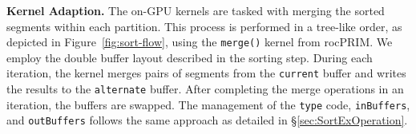 \begin{comment}
The input to this operation is $N$ sorted chunks each with a size of $C$.
The mapping step regroups those chunks in to $N$ new chunks $P_i\ (0 \leq i < N)$ such that max($P_i$) $\leq$ min($P_{i + 1}$) $\forall 0 \leq i < N - 1$.
Each new chunk contains $N$ sorted segments which can be efficiently merged on GPU.
For the convenience of explaining the idea, let us first assume all elements in the input are unique with a type $T$.
By performing binary searches on each sorted chunk, we can efficiently know the inclusive/exclusive percentile of a certain value $t \in T$ within the input.
This enables us to find, in a radix order, $N + 1$ different pivots $p_i \in T\ (i = 0, \ldots, N)$, where $p_i$ is the $\frac{i}{N}$th percentile of the entire input data. 
There are exactly $C$ elements $v$ in the input that satisfies $p_i \leq v < p_{i + 1}\ (0 \leq i < N)$, which can be efficiently located in the $N$ input sorted chunks.
Then, we can regroup a new chunk by taking all elements between two pivots from each sorted chunk.
This idea is illustrated in Figure~\ref{fig:sort-flow}, where the white points on the \texttt{MergeExKernel}'s \texttt{inputs()} represent the location of pivots.
These white dots separate the input chunks and then regroup them into 4 partitions.
This idea can be easily extended to support the case where the values are not unique. 
Slight adjustment to the partition boundary can be applied to ensure each chunk contains exactly $C$ elements.
The output is partitioned accordingly to hold the final result.
\end{comment}

\noindent
\textbf{Kernel Adaption.}
The on-GPU kernels are tasked with merging the sorted segments within each partition. 
This process is performed in a tree-like order, as depicted in Figure~\ref{fig:sort-flow}, using the \texttt{merge()} kernel from rocPRIM.
We employ the double buffer layout described in the sorting step. 
During each iteration, the kernel merges pairs of segments from the \texttt{current} buffer and writes the results to the \texttt{alternate} buffer. 
After completing the merge operations in an iteration, the buffers are swapped. 
The management of the \texttt{type} code, \texttt{inBuffers}, and \texttt{outBuffers} follows the same approach as detailed in \S\ref{sec:SortExOperation}.

\begin{comment}
The responsibility of the on-GPU kernels is to merge the sorted segments in each partition together.
We iteratively merge the segments in a tree-like order as shown in Figure~\ref{fig:sort-flow}, using the \texttt{merge()} kernel from rocPRIM.
We follow the double buffer data layout mentioned in the sort step.
In each iteration, we merge the pairs of segments with \texttt{merge()} from \texttt{current} and output the result to \texttt{alternate}.
At the end of each iteration, we swap the double buffer. 
The \texttt{type} code, \texttt{inBuffers}, and \texttt{outBuffers} are managed in a similar way as \S\ref{sec:SortExOperation}.
\end{comment}


